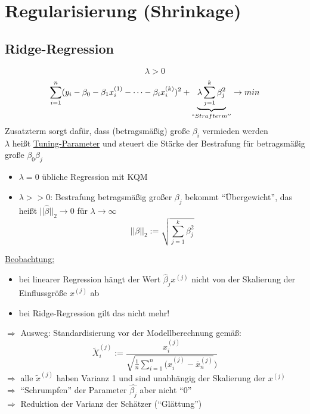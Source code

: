 \section{Regularisierung (Shrinkage)}
\subsection{Ridge-Regression}
\[ \lambda > 0 \]
\[ \sum\limits_{i=1}^{n} (y_i - \beta_0 - \beta_1 x_i^{(1)} - \dots - \beta_i x_i^{(k)})^2 + \underbrace{\lambda \sum\limits_{j=1}^{k} \beta_j^{2}}_{``Strafterm''} \rightarrow min \]
	Zusatzterm sorgt dafür, dass (betragsmäßig) große $\beta_i$ vermieden werden \\
	$\lambda$ heißt \underline{Tuning-Parameter} und steuert die Stärke der Bestrafung für betragsmäßig große $\beta_0 \beta_j$
	\begin{itemize}
		\item $\lambda=0$ übliche Regression mit KQM
		\item $\lambda >>0$: Bestrafung betragsmäßig großer $\beta_j$ bekommt ``Übergewicht'', das heißt $||\hat{\beta}||_2 \rightarrow 0 $ für $\lambda \rightarrow \infty $
			\[ ||\beta ||_2 := \sqrt{\sum\limits_{j=1}^{k}\beta_j^{2}} \]
	\end{itemize}
	\underline{Beobachtung:}
	\begin{itemize}
		\item bei linearer Regression hängt der Wert $\hat{\beta}_j x^{(j)}$ nicht von der Skalierung der Einflussgröße $x^{(j)}$ ab
		\item bei Ridge-Regression gilt das nicht mehr!
	\end{itemize}
$\Rightarrow$ Ausweg: Standardisierung vor der Modellberechnung gemäß:
\[ \tilde{X}_i^{(j)} := \frac{x_i^{(j)}}{\sqrt{\frac{1}{n}\sum\limits_{i=1}^{n}(x_i^{(j)} - \bar{x}^{(j)}_n})} \]
$\Rightarrow $ alle $\tilde{x}^{(j)}$ haben Varianz 1 und sind unabhängig der Skalierung der $x^{(j)}$ \\
$\Rightarrow$ ``Schrumpfen'' der Parameter $\hat{\beta_j}$ aber nicht ``0'' \\
$\Rightarrow$ Reduktion der Varianz der Schätzer (``Glättung'')

